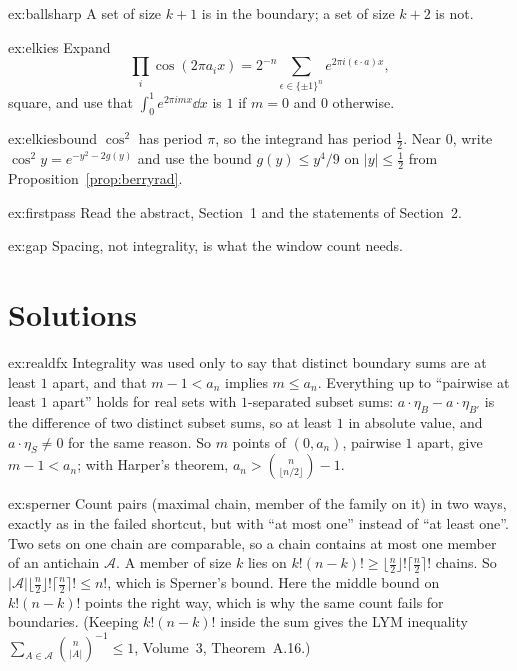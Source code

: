 \begin{hint}{ex:ballsharp}
A set of size $k+1$ is in the boundary; a set of size $k+2$ is not.
\end{hint}

\begin{hint}{ex:elkies}
Expand
\[
\prod_i\cos(2\pi a_ix)=2^{-n}\sum_{\epsilon\in\{\pm1\}^n}e^{2\pi i(\epsilon\cdot a)x},
\]
square, and use that $\int_0^1e^{2\pi imx}\dd x$ is $1$ if $m=0$ and $0$ otherwise.
\end{hint}

\begin{hint}{ex:elkiesbound}
$\cos^2$ has period $\pi$, so the integrand has period $\frac12$. Near $0$, write $\cos^2y=e^{-y^2-2g(y)}$ and use the bound $g(y)\le y^4/9$ on $|y|\le\frac12$ from Proposition~\ref{prop:berryrad}.
\end{hint}

\begin{hint}{ex:firstpass}
Read the abstract, Section~1 and the statements of Section~2.
\end{hint}

\begin{hint}{ex:gap}
Spacing, not integrality, is what the window count needs.
\end{hint}

\section{Solutions}

\begin{solution}{ex:realdfx}
\idea Integrality was used only to say that distinct boundary sums are at least $1$ apart, and that $m-1<a_n$ implies $m\le a_n$.
\writeup Everything up to ``pairwise at least $1$ apart'' holds for real sets with $1$-separated subset sums: $a\cdot\eta_B-a\cdot\eta_{B'}$ is the difference of two distinct subset
sums, so at least $1$ in absolute value, and $a\cdot\eta_S\ne0$ for the same reason. So $m$ points of $(0,a_n)$, pairwise $1$ apart, give $m-1<a_n$; with Harper's theorem, $a_n>\binom n{\lfloor n/2\rfloor}-1$.
\end{solution}

\begin{solution}{ex:sperner}
\idea Count pairs (maximal chain, member of the family on it) in two ways, exactly as in the failed shortcut, but with ``at most one'' instead of ``at least one''.
\writeup Two sets on one chain are comparable, so a chain contains at most one member of an antichain $\mathcal A$. A member of size $k$ lies on $k!(n-k)!\ge\lfloor\frac n2\rfloor!\lceil\frac n2\rceil!$ chains. So
$|\mathcal A|\lfloor\frac n2\rfloor!\lceil\frac n2\rceil!\le n!$, which is Sperner's bound. Here the middle bound on $k!(n-k)!$ points the right way, which is why the same count fails for boundaries. (Keeping $k!(n-k)!$ inside the sum gives the LYM inequality $\sum_{A\in\mathcal A}\binom n{|A|}^{-1}\le1$, Volume~3, Theorem~A.16.)
\end{solution}

